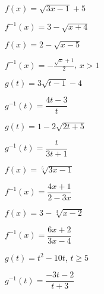 \documentclass{ximera}
\begin{document}
\begin{question}
$f(x) = \sqrt{3x-1}+5$
\begin{solution}
$f^{-1}(x) = 3 - \sqrt{x+4}$
\end{solution}

\end{question}

\begin{question}
$f(x) = 2-\sqrt{x - 5}$

\begin{solution}
$f^{-1}(x) =-\frac{\sqrt{x}+1}{2}$, $x > 1$

\end{solution}

\end{question}

\begin{question}
$g(t) = 3\sqrt{t-1}-4$
\begin{solution}
$g^{-1}(t) = \dfrac{4t-3}{t}$
\end{solution}

\end{question}

\begin{question}
$g(t) = 1 - 2\sqrt{2t+5}$


\begin{solution}
$g^{-1}(t) = \dfrac{t}{3t+1}$

\end{solution}

\end{question}

\begin{question}
$f(x) = \sqrt[5]{3x-1}$
\begin{solution}
$f^{-1}(x) = \dfrac{4x+1}{2-3x}$
\end{solution}

\end{question}

\begin{question}
$f(x) = 3-\sqrt[3]{x-2}$

\begin{solution}
$f^{-1}(x) = \dfrac{6x + 2}{3x - 4}$

\end{solution}

\end{question}

\begin{question}
$g(t) = t^2 - 10t$, $t \geq 5$
\begin{solution}
$g^{-1}(t) = \dfrac{-3t - 2}{t + 3}$
\end{solution}

\end{question}
\end{document}
